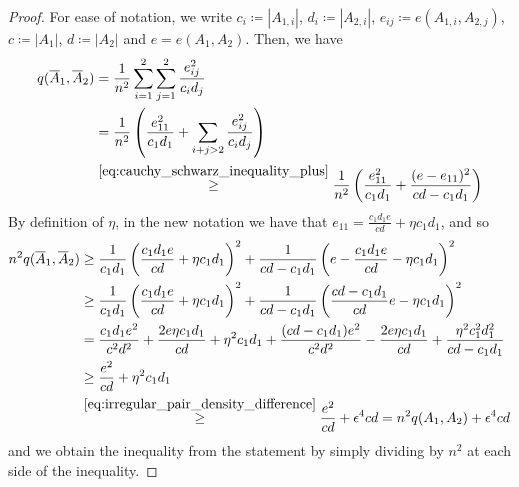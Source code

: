 \begin{lemma}
\begin{proof}
                For ease of notation, we write $c_i \coloneqq |A_{1,i}|$, $d_i \coloneqq |A_{2,i}|$,
                $e_{ij} \coloneqq e(A_{1,i},A_{2,j})$, $c \coloneqq |A_1|$, $d \coloneqq |A_2|$ and $e = e(A_1, A_2)$.
                Then, we have
                \begin{align*}
                    q(\overline{A}_1, \overline{A}_2)
                        & = \frac{1}{n^2} \sum_{i=1}^2 \sum_{j=1}^2 \frac{e_{ij}^2}{c_i d_j} \\
                        & = \frac{1}{n^2} \left( 
                            \frac{e_{11}^2}{c_1 d_1} + \sum_{i + j > 2} \frac{e_{ij}^2}{c_i d_j} \right) \\
                        & \stackrel{\eqref{eq:cauchy_schwarz_inequality_plus}}{\geq}
                            \frac{1}{n^2} \left( 
                                \frac{e_{11}^2}{c_1 d_1} + \frac{(e - e_{11})^2}{cd - c_1 d_1} \right)
                \end{align*}
                By definition of $\eta$, in the new notation we have that $e_{11} = \frac{c_1 d_1 e}{cd} + \eta c_1 d_1$,
                and so
                \begin{align*}
                    n^2 q(\overline{A}_1, \overline{A}_2)
                        & \geq \frac{1}{c_1 d_1} \left( \frac{c_1 d_1 e}{cd} + \eta c_1 d_1 \right)^2
                            + \frac{1}{cd - c_1 d_1} \left( e - \frac{c_1 d_1 e}{cd} - \eta c_1 d_1 \right)^2 \\
                        & \geq \frac{1}{c_1 d_1} \left( \frac{c_1 d_1 e}{cd} + \eta c_1 d_1 \right)^2
                            + \frac{1}{cd - c_1 d_1} \left( \frac{cd - c_1 d_1}{cd} e - \eta c_1 d_1 \right)^2 \\
                        & = \frac{c_1 d_1 e^2}{c^2 d^2} + \frac{2 e \eta c_1 d_1}{cd}
                            + \eta^2 c_1 d_1
                            + \frac{(cd - c_1 d_1) e^2}{c^2 d^2}
                            - \frac{2 e \eta c_1 d_1}{cd}
                            + \frac{\eta^2 c_1^2 d_1^2}{cd - c_1 d_1} \\
                        & \geq \frac{e^2}{cd} + \eta^2 c_1 d_1 \\
                        & \stackrel{\eqref{eq:irregular_pair_density_difference}}{\geq}
                            \frac{e^2}{cd} + \epsilon^4 c d = n^2 q(A_1, A_2) + \epsilon^4 c d
                \end{align*}
                and we obtain the inequality from the statement by simply dividing by $n^2$ at each side of the inequality.
            \end{proof}
        \end{lemma}

